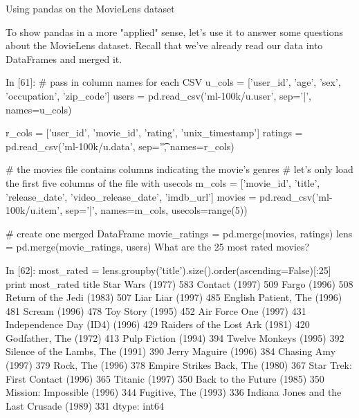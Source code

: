 


Using pandas on the MovieLens dataset

To show pandas in a more "applied" sense, let's use it to answer some questions about the MovieLens dataset. Recall that we've already read our data into DataFrames and merged it.

In [61]:
# pass in column names for each CSV
u_cols = ['user_id', 'age', 'sex', 'occupation', 'zip_code']
users = pd.read_csv('ml-100k/u.user', sep='|', names=u_cols)

r_cols = ['user_id', 'movie_id', 'rating', 'unix_timestamp']
ratings = pd.read_csv('ml-100k/u.data', sep='\t', names=r_cols)

# the movies file contains columns indicating the movie's genres
# let's only load the first five columns of the file with usecols
m_cols = ['movie_id', 'title', 'release_date', 'video_release_date', 'imdb_url']
movies = pd.read_csv('ml-100k/u.item', sep='|', names=m_cols, usecols=range(5))

# create one merged DataFrame
movie_ratings = pd.merge(movies, ratings)
lens = pd.merge(movie_ratings, users)
What are the 25 most rated movies?

In [62]:
most_rated = lens.groupby('title').size().order(ascending=False)[:25]
print most_rated
title
Star Wars (1977)                             583
Contact (1997)                               509
Fargo (1996)                                 508
Return of the Jedi (1983)                    507
Liar Liar (1997)                             485
English Patient, The (1996)                  481
Scream (1996)                                478
Toy Story (1995)                             452
Air Force One (1997)                         431
Independence Day (ID4) (1996)                429
Raiders of the Lost Ark (1981)               420
Godfather, The (1972)                        413
Pulp Fiction (1994)                          394
Twelve Monkeys (1995)                        392
Silence of the Lambs, The (1991)             390
Jerry Maguire (1996)                         384
Chasing Amy (1997)                           379
Rock, The (1996)                             378
Empire Strikes Back, The (1980)              367
Star Trek: First Contact (1996)              365
Titanic (1997)                               350
Back to the Future (1985)                    350
Mission: Impossible (1996)                   344
Fugitive, The (1993)                         336
Indiana Jones and the Last Crusade (1989)    331
dtype: int64

